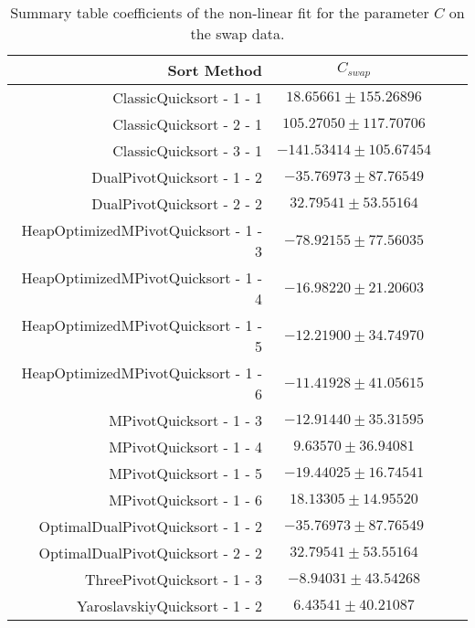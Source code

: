 		\begin{table}
			\begin{center}
				\begin{tabular}{|r|c|c|c}
					\hline
									Sort Method              &   $C_{swap}$      \\ \hline \hline
		                ClassicQuicksort - 1 - 1 &  $  18.65661 \pm 155.26896 $ \\ \hline
		                ClassicQuicksort - 2 - 1 &  $ 105.27050 \pm 117.70706 $ \\ \hline
		                ClassicQuicksort - 3 - 1 &  $-141.53414 \pm 105.67454 $ \\ \hline
		              DualPivotQuicksort - 1 - 2 &  $ -35.76973 \pm  87.76549 $ \\ \hline
		              DualPivotQuicksort - 2 - 2 &  $  32.79541 \pm  53.55164 $ \\ \hline
		    HeapOptimizedMPivotQuicksort - 1 - 3 &  $ -78.92155 \pm  77.56035 $ \\ \hline
		    HeapOptimizedMPivotQuicksort - 1 - 4 &  $ -16.98220 \pm  21.20603 $ \\ \hline
		    HeapOptimizedMPivotQuicksort - 1 - 5 &  $ -12.21900 \pm  34.74970 $ \\ \hline
		    HeapOptimizedMPivotQuicksort - 1 - 6 &  $ -11.41928 \pm  41.05615 $ \\ \hline
		                 MPivotQuicksort - 1 - 3 &  $ -12.91440 \pm  35.31595 $ \\ \hline
		                 MPivotQuicksort - 1 - 4 &  $   9.63570 \pm  36.94081 $ \\ \hline
		                 MPivotQuicksort - 1 - 5 &  $ -19.44025 \pm  16.74541 $ \\ \hline
		                 MPivotQuicksort - 1 - 6 &  $  18.13305 \pm  14.95520 $ \\ \hline
		       OptimalDualPivotQuicksort - 1 - 2 &  $ -35.76973 \pm  87.76549 $ \\ \hline
		       OptimalDualPivotQuicksort - 2 - 2 &  $  32.79541 \pm  53.55164 $ \\ \hline
		             ThreePivotQuicksort - 1 - 3 &  $  -8.94031 \pm  43.54268 $ \\ \hline
		           YaroslavskiyQuicksort - 1 - 2 &  $   6.43541 \pm  40.21087 $ \\ \hline
				\end{tabular}
				\caption{Summary table coefficients of the non-linear fit for the parameter $C$ on the swap data.}
				\label{tab:swapFitCoeffC}
			\end{center}
		\end{table}








